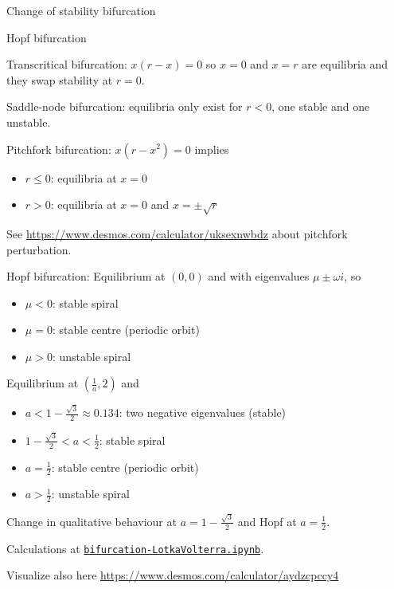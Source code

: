 \begin{solution}
\begin{slide}
\begin{parts}
	\item Change of stability bifurcation
	\item Hopf bifurcation
	\item Transcritical bifurcation: $x(r-x) = 0$ so $x=0$ and $x=r$ are equilibria and they swap stability at $r=0$.
	\item Saddle-node bifurcation: equilibria only exist for $r<0$, one stable and one unstable.
	\item Pitchfork bifurcation: $x(r-x^2)=0$ implies
	\begin{itemize}
		\item $r\leq 0$: equilibria at $x=0$
		\item $r>0$: equilibria at $x=0$ and $x=\pm \sqrt{r}$
	\end{itemize}
	See \url{https://www.desmos.com/calculator/uksexnwbdz} about pitchfork perturbation.
	\item Hopf bifurcation: Equilibrium at $(0,0)$ and with eigenvalues $\mu \pm \omega i$, so
	\begin{itemize}
		\item $\mu<0$: stable spiral
		\item $\mu = 0$: stable centre (periodic orbit)
		\item $\mu > 0$: unstable spiral
	\end{itemize}
	\item Equilibrium at $(\frac{1}{a},2)$ and
	\begin{itemize}
		\item $a < 1-\frac{\sqrt{3}}{2} \approx 0.134$: two negative eigenvalues (stable)
		\item $1-\frac{\sqrt{3}}{2}< a < \frac12$: stable spiral
		\item $ a = \frac12$: stable centre (periodic orbit)
		\item $ a > \frac12$: unstable spiral
	\end{itemize}
	
	Change in qualitative behaviour at $a = 1-\frac{\sqrt{3}}{2}$ and Hopf at $a = \frac12$.
	
	Calculations at \href{https://utoronto.syzygy.ca/jupyter/user-redirect/git-pull?repo=https://github.com/bigfatbernie/IBLMathModeling&subPath=book/python/bifurcation-LotkaVolterra.ipynb}{\tt bifurcation-LotkaVolterra.ipynb}.
	
	Visualize also here \url{https://www.desmos.com/calculator/aydzcpccy4}

\end{parts}
	
\end{slide}
	
\end{solution}








